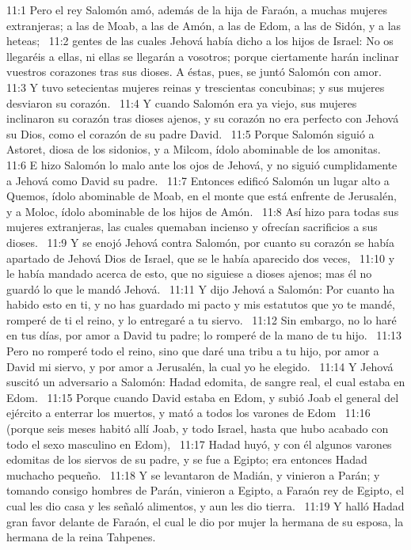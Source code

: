 11:1 Pero el rey Salomón amó, además de la hija de Faraón, a muchas mujeres extranjeras; a las de Moab, a las de Amón, a las de Edom, a las de Sidón, y a las heteas;  
11:2 gentes de las cuales Jehová había dicho a los hijos de Israel: No os llegaréis a ellas, ni ellas se llegarán a vosotros; porque ciertamente harán inclinar vuestros corazones tras sus dioses. A éstas, pues, se juntó Salomón con amor.  
11:3 Y tuvo setecientas mujeres reinas y trescientas concubinas; y sus mujeres desviaron su corazón.  
11:4 Y cuando Salomón era ya viejo, sus mujeres inclinaron su corazón tras dioses ajenos, y su corazón no era perfecto con Jehová su Dios, como el corazón de su padre David.  
11:5 Porque Salomón siguió a Astoret, diosa de los sidonios, y a Milcom, ídolo abominable de los amonitas.  
11:6 E hizo Salomón lo malo ante los ojos de Jehová, y no siguió cumplidamente a Jehová como David su padre.  
11:7 Entonces edificó Salomón un lugar alto a Quemos, ídolo abominable de Moab, en el monte que está enfrente de Jerusalén, y a Moloc, ídolo abominable de los hijos de Amón.  
11:8 Así hizo para todas sus mujeres extranjeras, las cuales quemaban incienso y ofrecían sacrificios a sus dioses.  
11:9 Y se enojó Jehová contra Salomón, por cuanto su corazón se había apartado de Jehová Dios de Israel, que se le había aparecido dos veces,  
11:10 y le había mandado acerca de esto, que no siguiese a dioses ajenos; mas él no guardó lo que le mandó Jehová.  
11:11 Y dijo Jehová a Salomón: Por cuanto ha habido esto en ti, y no has guardado mi pacto y mis estatutos que yo te mandé, romperé de ti el reino, y lo entregaré a tu siervo.  
11:12 Sin embargo, no lo haré en tus días, por amor a David tu padre; lo romperé de la mano de tu hijo.  
11:13 Pero no romperé todo el reino, sino que daré una tribu a tu hijo, por amor a David mi siervo, y por amor a Jerusalén, la cual yo he elegido.  
11:14 Y Jehová suscitó un adversario a Salomón: Hadad edomita, de sangre real, el cual estaba en Edom.  
11:15 Porque cuando David estaba en Edom, y subió Joab el general del ejército a enterrar los muertos, y mató a todos los varones de Edom  
11:16 (porque seis meses habitó allí Joab, y todo Israel, hasta que hubo acabado con todo el sexo masculino en Edom),  
11:17 Hadad huyó, y con él algunos varones edomitas de los siervos de su padre, y se fue a Egipto; era entonces Hadad muchacho pequeño.  
11:18 Y se levantaron de Madián, y vinieron a Parán; y tomando consigo hombres de Parán, vinieron a Egipto, a Faraón rey de Egipto, el cual les dio casa y les señaló alimentos, y aun les dio tierra.  
11:19 Y halló Hadad gran favor delante de Faraón, el cual le dio por mujer la hermana de su esposa, la hermana de la reina Tahpenes.  
